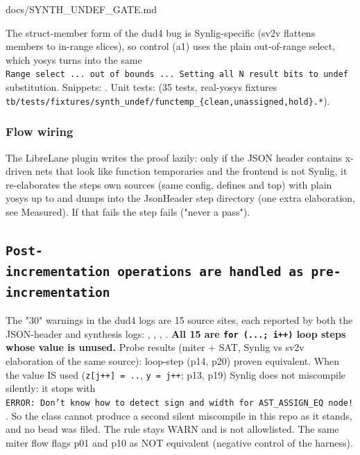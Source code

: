 \begin{relocated}{docs/SYNTH_UNDEF_GATE.md}
{}

The struct-member form of the dud4 bug is Synlig-specific (sv2v flattens
members to in-range slices), so control (a1) uses the plain out-of-range
select, which yosys turns into the same
\texttt{Range\ select\ .\allowbreak{}.\allowbreak{}.\allowbreak{}\ out\ of\ bounds\ .\allowbreak{}.\allowbreak{}.\allowbreak{}\ Setting\ all\ N\ result\ bits\ to\ undef}
substitution. Snippets: . Unit
tests:  (35 tests,
real-yosys fixtures
\texttt{tb/\allowbreak{}tests/\allowbreak{}fixtures/\allowbreak{}synth\_\allowbreak{}undef/\allowbreak{}functemp\_\allowbreak{}\{clean,\allowbreak{}unassigned,\allowbreak{}hold\}.\allowbreak{}*}).

\subsubsection{Flow wiring}\label{tm:flow:synth-undef-gate:flow-wiring}

The LibreLane plugin writes the proof lazily: only if the JSON header
contains x-driven nets that look like function temporaries and the
frontend is not Synlig, it re-elaborates the step\textquotesingle s own
sources (same config, defines and top) with plain yosys up to
 and dumps  into the
JsonHeader step directory (one extra elaboration, see Measured). If that
fails the step fails ("never a pass").

\subsection{\texorpdfstring{\texttt{Post-\allowbreak{}incrementation\ operations\ are\ handled\ as\ pre-\allowbreak{}incrementation}}{}}\label{tm:flow:synth-undef-gate:post-incrementation-operations-are-handled-as-pre-incrementation}

The "30" warnings in the dud4 logs are 15 source sites, each reported by
both the JSON-header and synthesis logs: ,
,
,
. \textbf{All 15 are
\texttt{for\ (.\allowbreak{}.\allowbreak{}.\allowbreak{};\ i+\allowbreak{}+\allowbreak{})}
loop steps whose value is unused.} Probe results (miter + SAT, Synlig vs
sv2v elaboration of the same source): loop-step  (p14, p20)
proven equivalent. When the value IS used
(\texttt{z[j+\allowbreak{}+\allowbreak{}]\ =\allowbreak{}\ .\allowbreak{}.\allowbreak{}},
\texttt{y\ =\allowbreak{}\ j+\allowbreak{}+\allowbreak{}}; p13, p19)
Synlig does not miscompile silently: it stops with
\texttt{ERROR:\allowbreak{}\ Don't\ know\ how\ to\ detect\ sign\ and\ width\ for\ AST\_\allowbreak{}ASSIGN\_\allowbreak{}EQ\ node!}.
So the class cannot produce a second silent miscompile in this repo as
it stands, and no bead was filed. The rule stays WARN and is not
allowlisted. The same miter flow flags p01 and p10 as NOT equivalent
(negative control of the harness).


\end{relocated}
